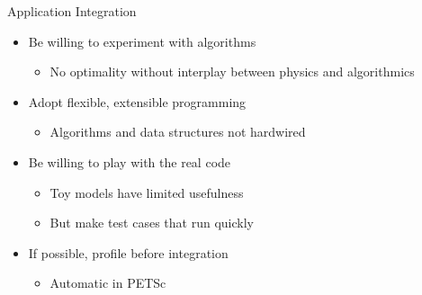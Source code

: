 \begin{frame}{Application Integration}

\begin{itemize}
  \item Be willing to experiment with algorithms
  \begin{itemize}
    \item No optimality without interplay between physics and algorithmics
  \end{itemize}

  \item Adopt flexible, extensible programming
  \begin{itemize}
    \item Algorithms and data structures not hardwired
  \end{itemize}

  \item Be willing to play with the real code
  \begin{itemize}
    \item Toy models have limited usefulness
    \item But make test cases that run quickly
  \end{itemize}

  \item If possible, profile before integration
  \begin{itemize}
    \item Automatic in PETSc
  \end{itemize}
\end{itemize}

\end{frame}
